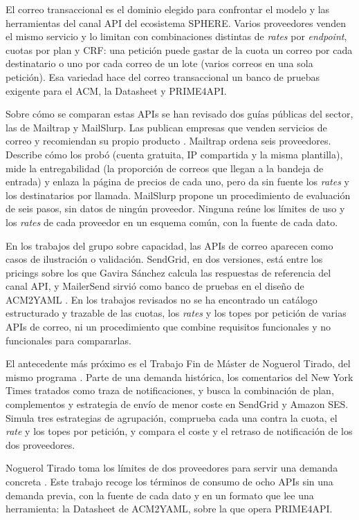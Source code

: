 El correo transaccional es el dominio elegido para confrontar el modelo y
las herramientas del canal API del ecosistema SPHERE. Varios proveedores
venden el mismo servicio y lo limitan con combinaciones distintas de
\textit{rates} por \textit{endpoint}, cuotas por plan y CRF: una petición
puede gastar de la cuota un correo por cada destinatario o uno por cada
correo de un lote (varios correos en una sola petición). Esa variedad
hace del correo transaccional un banco de pruebas exigente para el ACM,
la Datasheet y PRIME4API.

Sobre cómo se comparan estas APIs se han revisado dos guías públicas
del sector, las de Mailtrap y MailSlurp. Las publican empresas que venden
servicios de correo y recomiendan su propio producto
\citep{mailtrap2026comparativa,mailslurp2026comparativa}. Mailtrap ordena
seis proveedores. Describe cómo los probó (cuenta gratuita, IP compartida
y la misma plantilla), mide la entregabilidad (la proporción de correos
que llegan a la bandeja de entrada) y enlaza la página de
precios de cada uno, pero da sin fuente los \textit{rates} y los
destinatarios por llamada. MailSlurp propone un procedimiento de
evaluación de seis pasos, sin datos de ningún proveedor. Ninguna reúne los límites
de uso y los \textit{rates} de cada proveedor en un esquema común, con la
fuente de cada dato.

En los trabajos del grupo sobre capacidad, las APIs de correo aparecen
como casos de ilustración o validación. SendGrid, en dos versiones, está
entre los pricings sobre los que Gavira Sánchez calcula las respuestas de
referencia del canal API, y MailerSend sirvió como banco de pruebas en el
diseño de ACM2YAML \citep{gavira2026tfm}. En los trabajos revisados no se ha
encontrado un catálogo estructurado y trazable de las cuotas, los
\textit{rates} y los topes por petición de varias APIs de correo, ni un
procedimiento que combine requisitos funcionales y no funcionales para
compararlas.

El antecedente más próximo es el Trabajo Fin de Máster de Noguerol
Tirado, del mismo programa \citep{noguerol2025tfm}. Parte de una demanda
histórica, los comentarios del New York Times tratados como traza de
notificaciones, y busca la combinación de plan, complementos y estrategia
de envío de menor coste en SendGrid y Amazon SES. Simula tres estrategias
de agrupación, comprueba cada una contra la cuota, el \textit{rate} y los
topes por petición, y compara el coste y el retraso de notificación de
los dos proveedores.

Noguerol Tirado toma los límites de dos proveedores para servir una
demanda concreta \citep{noguerol2025tfm}. Este trabajo recoge los
términos de consumo de ocho APIs sin una demanda previa, con la fuente de
cada dato y en un formato que lee una herramienta: la Datasheet de
ACM2YAML, sobre la que opera PRIME4API.

